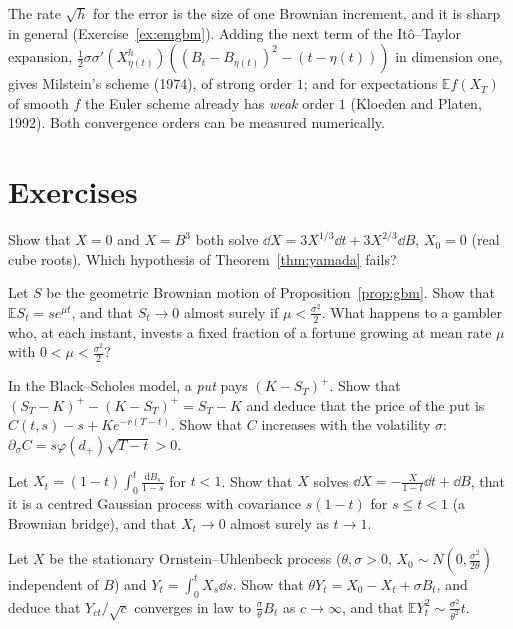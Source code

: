 The rate $\sqrt h$ for the error is the size of one Brownian increment, and it is sharp in general (Exercise~\ref{ex:emgbm}). Adding the next term of the It\^o--Taylor expansion,
$\frac12\sigma\sigma'(X^h_{\eta(t)})((B_t-B_{\eta(t)})^2-(t-\eta(t)))$ in dimension one, gives Milstein's scheme (1974), of strong order $1$; and for expectations $\mathbb Ef(X_T)$ of smooth $f$ the Euler scheme
already has \emph{weak} order $1$ (Kloeden and Platen, 1992). Both convergence orders can be measured numerically.

\section{Exercises}

\begin{exercise}[$\star$]\label{ex:nonunique}
Show that $X=0$ and $X=B^3$ both solve $\dd X=3X^{1/3}\dd t+3X^{2/3}\dd B$, $X_0=0$ (real cube roots). Which hypothesis of Theorem~\ref{thm:yamada} fails?
\end{exercise}

\begin{exercise}[$\star$]\label{ex:gbm}
Let $S$ be the geometric Brownian motion of Proposition~\ref{prop:gbm}. Show that $\mathbb ES_t=se^{\mu t}$, and that $S_t\to0$ almost surely if $\mu<\frac{\sigma^2}2$. What happens to a gambler who, at each instant,
invests a fixed fraction of a fortune growing at mean rate $\mu$ with $0<\mu<\frac{\sigma^2}2$?
\end{exercise}

\begin{exercise}[$\star$]\label{ex:putcall}
In the Black--Scholes model, a \emph{put} pays $(K-S_T)^+$. Show that $(S_T-K)^+-(K-S_T)^+=S_T-K$ and deduce that the price of the put is $C(t,s)-s+Ke^{-r(T-t)}$. Show that $C$ increases with the
volatility $\sigma$: $\partial_\sigma C=s\varphi(d_+)\sqrt{T-t}>0$.
\end{exercise}

\begin{exercise}[$\star\star$]\label{ex:bridgesde}
Let $X_t=(1-t)\int_0^t\frac{\mathrm dB_s}{1-s}$ for $t<1$. Show that $X$ solves $\dd X=-\frac{X}{1-t}\dd t+\dd B$, that it is a centred Gaussian process with covariance $s(1-t)$ for $s\le t<1$ (a Brownian bridge),
and that $X_t\to0$ almost surely as $t\to1$.
\end{exercise}

\begin{exercise}[$\star\star$]\label{ex:langevin}
Let $X$ be the stationary Ornstein--Uhlenbeck process ($\theta,\sigma>0$, $X_0\sim N(0,\frac{\sigma^2}{2\theta})$ independent of $B$) and $Y_t=\int_0^tX_s\dd s$. Show that $\theta Y_t=X_0-X_t+\sigma B_t$, and deduce that
$Y_{ct}/\sqrt c$ converges in law to $\frac\sigma\theta B_t$ as $c\to\infty$, and that $\mathbb EY_t^2\sim\frac{\sigma^2}{\theta^2}t$.
\end{exercise}

